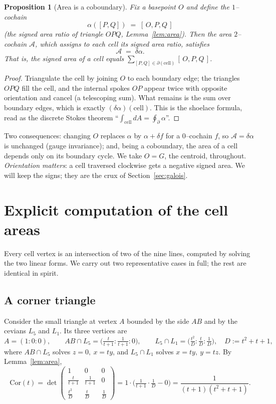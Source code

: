 \documentclass[11pt,a4paper,reqno]{amsart}
\newtheorem{proposition}[theorem]{Proposition}
\theoremstyle{definition}
\theoremstyle{remark}
\newcommand{\Cor}{\mathrm{Cor}}
\begin{document}
\begin{proposition}[Area is a coboundary]\label{prop:cob}
Fix a basepoint $O$ and define the $1$--cochain
\[
\alpha([P,Q]) \;=\; [\,O,P,Q\,]
\]
(the signed area ratio of triangle $OPQ$, Lemma~\ref{lem:area}). Then the \emph{area $2$--cochain} $\mathcal A$,
which assigns to each cell its signed area ratio, satisfies
\[
\mathcal A \;=\; \delta\alpha .
\]
That is, the signed area of a cell equals $\sum_{[P,Q]\in\partial(\text{cell})}[\,O,P,Q\,]$.
\end{proposition}
\begin{proof}
Triangulate the cell by joining $O$ to each boundary edge; the triangles $OPQ$ fill the cell, and the internal
spokes $OP$ appear twice with opposite orientation and cancel (a telescoping sum). What remains is the sum over
boundary edges, which is exactly $(\delta\alpha)(\text{cell})$. This is the shoelace formula, read as the discrete
Stokes theorem ``$\int_{\text{cell}}dA=\oint_{\partial}\alpha$''.
\end{proof}
Two consequences: changing $O$ replaces $\alpha$ by $\alpha+\delta f$ for a $0$--cochain $f$, so
$\mathcal A=\delta\alpha$ is unchanged (gauge invariance); and, being a coboundary, the area of a cell depends only
on its boundary cycle. We take $O=G$, the centroid, throughout. \emph{Orientation matters}: a cell traversed
clockwise gets a negative signed area. We will keep the signs; they are the crux of Section~\ref{sec:galois}.

\section{Explicit computation of the cell areas}\label{sec:areas}
Every cell vertex is an intersection of two of the nine lines, computed by solving the two linear forms. We
carry out two representative cases in full; the rest are identical in spirit.

\subsection{A corner triangle}
Consider the small triangle at vertex $A$ bounded by the side $AB$ and by the cevians $L_5$ and $L_1$. Its three
vertices are
\[
A=(1:0:0),\qquad
AB\cap L_5=\Big(\tfrac{t}{t+1}:\tfrac{1}{t+1}:0\Big),\qquad
L_5\cap L_1=\Big(\tfrac{t^2}{D}:\tfrac{t}{D}:\tfrac1D\Big),\quad D:=t^2+t+1,
\]
where $AB\cap L_5$ solves $z=0,\ x=ty$, and $L_5\cap L_1$ solves $x=ty,\ y=tz$. By Lemma~\ref{lem:area},
\[
\Cor(t)=\det\!\begin{pmatrix}
1&0&0\\[2pt]
\tfrac{t}{t+1}&\tfrac{1}{t+1}&0\\[2pt]
\tfrac{t^2}{D}&\tfrac{t}{D}&\tfrac1D
\end{pmatrix}
=1\cdot\Big(\tfrac{1}{t+1}\cdot\tfrac1D-0\Big)
=\frac{1}{(t+1)(t^2+t+1)} .
\]
\end{document}
